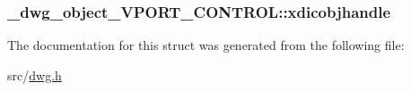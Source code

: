 \hypertarget{struct__dwg__object__VPORT__CONTROL_a2a0dc8a4a0f7a401dbd8964725aca2ab}{
\subsubsection[{xdicobjhandle}]{ {\bf \-\_\-dwg\-\_\-object\-\_\-\-V\-P\-O\-R\-T\-\_\-\-C\-O\-N\-T\-R\-O\-L\-::xdicobjhandle}}}\label{struct__dwg__object__VPORT__CONTROL_a2a0dc8a4a0f7a401dbd8964725aca2ab}


\-The documentation for this struct was generated from the following file\-:\begin{DoxyCompactItemize}
\item 
src/\hyperlink{dwg_8h}{dwg.\-h}\end{DoxyCompactItemize}
